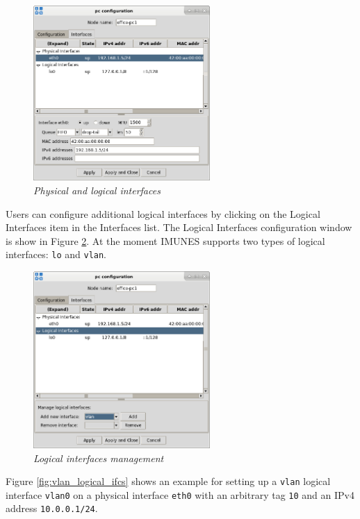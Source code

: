 \begin{figure}[H]
\centering
\vspace{10pt}
\includegraphics[width=0.6\textwidth]{./images/physical_logical_interfaces.png}
\caption{\emph{Physical and logical interfaces}}
\label{fig:phys_log_ifc}
\end{figure} 

Users can configure additional logical interfaces by clicking on the Logical
Interfaces item in the Interfaces list. The Logical Interfaces configuration
window is show in Figure \ref{fig:logical_ifcs}.  At the moment IMUNES supports
two types of logical interfaces: \texttt{lo} and \texttt{vlan}.

\begin{figure}[H]
\centering
\vspace{10pt}
\includegraphics[width=0.6\textwidth]{./images/logical_interfaces.png}
\caption{\emph{Logical interfaces management}}
\label{fig:logical_ifcs}
\end{figure}

Figure \ref{fig:vlan_logical_ifcs} shows an example for setting up a
\texttt{vlan} logical interface \texttt{vlan0} on a physical interface
\texttt{eth0} with an arbitrary tag \texttt{10} and an IPv4 address
\texttt{10.0.0.1/24}.

